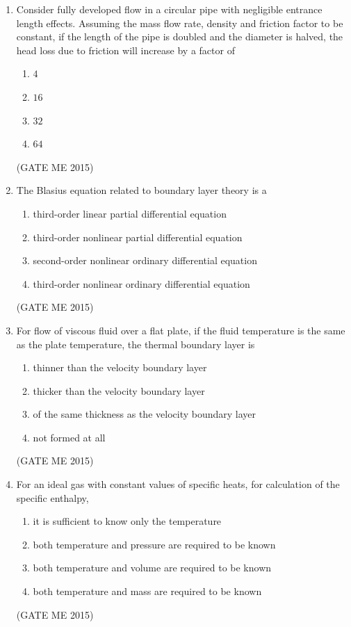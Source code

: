 \documentclass[journal]{IEEEtran}
\begin{document}
\begin{enumerate}
\item Consider fully developed flow in a circular pipe with negligible entrance length effects.
Assuming the mass flow rate, density and friction factor to be constant, if the length of the
pipe is doubled and the diameter is halved, the head loss due to friction will increase by a factor of
\begin{multicols}{4}
\begin{enumerate}
\item $4$
\item $16$
\item $32$
\item $64$
\end{enumerate}
\end{multicols}
\hfill  (GATE ME 2015)

\item The Blasius equation related to boundary layer theory is a
\begin{enumerate}
\item third-order linear partial differential equation
\item third-order nonlinear partial differential equation
\item second-order nonlinear ordinary differential equation
\item third-order nonlinear ordinary differential equation
\end{enumerate}
\hfill  (GATE ME 2015)

\item For flow of viscous fluid over a flat plate, if the fluid temperature is the same as the plate
temperature, the thermal boundary layer is
\begin{enumerate}
\item thinner than the velocity boundary layer
\item thicker than the velocity boundary layer
\item of the same thickness as the velocity boundary layer
\item not formed at all
\end{enumerate}
\hfill  (GATE ME 2015)

\item For an ideal gas with constant values of specific heats, for calculation of the specific enthalpy,
\begin{enumerate}
\item it is sufficient to know only the temperature
\item both temperature and pressure are required to be known
\item both temperature and volume are required to be known
\item both temperature and mass are required to be known
\end{enumerate}
\hfill  (GATE ME 2015)


\end{enumerate}
\end{document}
